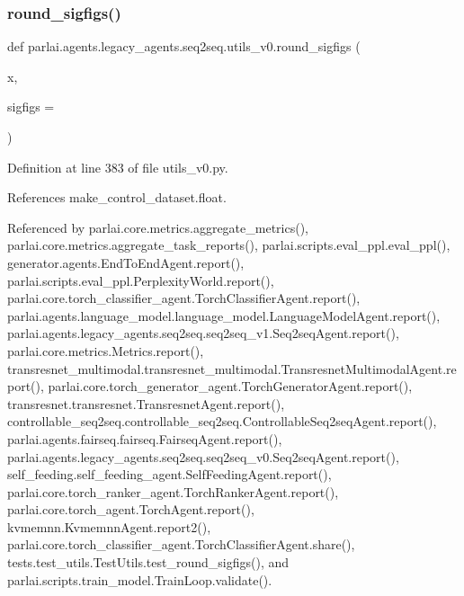 \subsubsection{\texorpdfstring{round\+\_\+sigfigs()}{round\_sigfigs()}}
{\footnotesize\ttfamily def parlai.\+agents.\+legacy\+\_\+agents.\+seq2seq.\+utils\+\_\+v0.\+round\+\_\+sigfigs (\begin{DoxyParamCaption}\item[{}]{x,  }\item[{}]{sigfigs = {} }\end{DoxyParamCaption})}



Definition at line 383 of file utils\+\_\+v0.\+py.



References make\+\_\+control\+\_\+dataset.\+float.



Referenced by parlai.\+core.\+metrics.\+aggregate\+\_\+metrics(), parlai.\+core.\+metrics.\+aggregate\+\_\+task\+\_\+reports(), parlai.\+scripts.\+eval\+\_\+ppl.\+eval\+\_\+ppl(), generator.\+agents.\+End\+To\+End\+Agent.\+report(), parlai.\+scripts.\+eval\+\_\+ppl.\+Perplexity\+World.\+report(), parlai.\+core.\+torch\+\_\+classifier\+\_\+agent.\+Torch\+Classifier\+Agent.\+report(), parlai.\+agents.\+language\+\_\+model.\+language\+\_\+model.\+Language\+Model\+Agent.\+report(), parlai.\+agents.\+legacy\+\_\+agents.\+seq2seq.\+seq2seq\+\_\+v1.\+Seq2seq\+Agent.\+report(), parlai.\+core.\+metrics.\+Metrics.\+report(), transresnet\+\_\+multimodal.\+transresnet\+\_\+multimodal.\+Transresnet\+Multimodal\+Agent.\+report(), parlai.\+core.\+torch\+\_\+generator\+\_\+agent.\+Torch\+Generator\+Agent.\+report(), transresnet.\+transresnet.\+Transresnet\+Agent.\+report(), controllable\+\_\+seq2seq.\+controllable\+\_\+seq2seq.\+Controllable\+Seq2seq\+Agent.\+report(), parlai.\+agents.\+fairseq.\+fairseq.\+Fairseq\+Agent.\+report(), parlai.\+agents.\+legacy\+\_\+agents.\+seq2seq.\+seq2seq\+\_\+v0.\+Seq2seq\+Agent.\+report(), self\+\_\+feeding.\+self\+\_\+feeding\+\_\+agent.\+Self\+Feeding\+Agent.\+report(), parlai.\+core.\+torch\+\_\+ranker\+\_\+agent.\+Torch\+Ranker\+Agent.\+report(), parlai.\+core.\+torch\+\_\+agent.\+Torch\+Agent.\+report(), kvmemnn.\+Kvmemnn\+Agent.\+report2(), parlai.\+core.\+torch\+\_\+classifier\+\_\+agent.\+Torch\+Classifier\+Agent.\+share(), tests.\+test\+\_\+utils.\+Test\+Utils.\+test\+\_\+round\+\_\+sigfigs(), and parlai.\+scripts.\+train\+\_\+model.\+Train\+Loop.\+validate().

